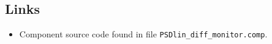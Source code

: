 \subsection*{Links}
\begin{itemize}
  \item Component source code found in file \texttt{PSDlin\_diff\_monitor.comp}.
\end{itemize}
